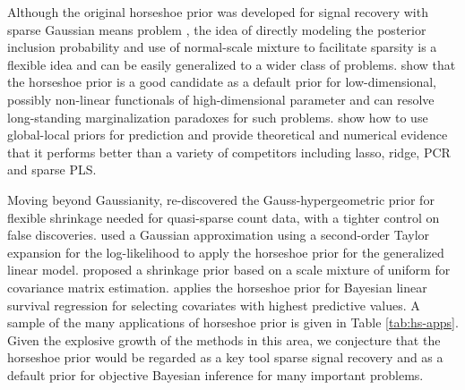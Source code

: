 \documentclass[11pt]{article}
\begin{document}
Although the original horseshoe prior was developed for signal recovery with sparse Gaussian means problem , the idea of directly modeling the posterior inclusion probability and use of normal-scale mixture to facilitate sparsity is a flexible idea and can be easily generalized to a wider class of problems. \citet{bhadra2015default} show that the horseshoe prior is a good candidate as a default prior for low-dimensional, possibly non-linear functionals of high-dimensional parameter and can resolve long-standing marginalization paradoxes for such problems. \citet{bhadra2016prediction} show how to use global-local priors for prediction and provide theoretical and numerical evidence that it performs better than a variety of competitors including lasso, ridge, PCR and sparse PLS. 

Moving beyond Gaussianity, \citet{datta2016bayesian} re-discovered the Gauss-hypergeometric prior for flexible shrinkage needed for quasi-sparse count data, with a tighter control on false discoveries. \citet{piironen2016hyperprior} used a Gaussian approximation using a second-order Taylor expansion for the log-likelihood to apply the horseshoe prior for the generalized linear model. \citet{wang2013class} proposed a shrinkage prior based on a scale mixture of uniform for covariance matrix estimation. \citet{peltola2014hierarchical} applies the horseshoe prior for Bayesian linear survival regression for selecting covariates with highest predictive values. A sample of the many applications of horseshoe prior is given in Table \ref{tab:hs-apps}. Given the explosive growth of the methods in this area, we conjecture that the horseshoe prior would be regarded as a key tool sparse signal recovery and as a default prior for objective Bayesian inference for many important problems. 
\end{document}
